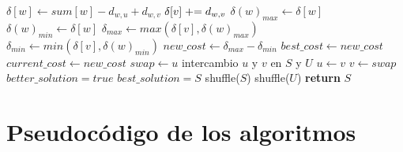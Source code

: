 \begin{algorithm}[H]
\begin{algorithmic}
                    \State $\delta[w] \gets sum[w] - d_{w,u} + d_{w,v}$
                    \State $\delta[v] \mathrel{+}= d_{w,v}$
                    \State
                        \State $\delta(w)_{max} \gets \delta[w]$
                    \EndIf
                        \State $\delta(w)_{min} \gets \delta[w]$
                    \EndIf
                \EndIf
            \EndFor
            \State
            \State $\delta_{max} \gets max(\delta[v], \delta(w)_{max})$
            \State $\delta_{min} \gets min(\delta[v], \delta(w)_{min})$
            \State $new\_cost \gets \delta_{max} - \delta_{min}$
                \State $best\_cost \gets new\_cost$
                \State $current\_cost \gets new\_cost$
                \State
                \State $swap \gets u$ \Comment intercambio $u$ y $v$ en $S$ y $U$
                \State $u \gets v$
                \State $v \gets swap$
                \State $better\_solution = true$
                \State $best\_solution = S$
            \EndIf
            \State
        \EndFor
    \EndFor
    \State
    \State shuffle($S$)
    \State shuffle($U$)
\EndWhile
\State
\State \textbf{return} $S$  
\end{algorithmic}
\end{algorithm}



\part{Pseudocódigo de los algoritmos}

\newpage

\nocite{*}




